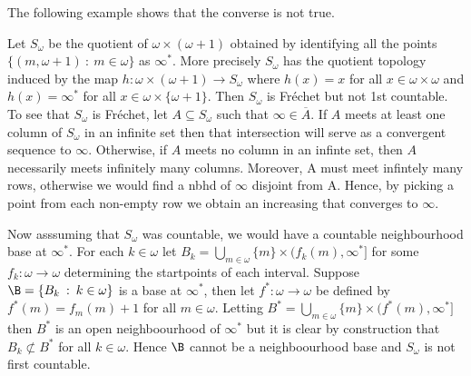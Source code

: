 \documentclass{article}
\begin{document}
The following example shows that the converse is not true. 
\begin{exam}
    Let \(S_{\omega}\) be the quotient of \(\omega \times (\omega + 1)\) obtained by identifying all the points \(\{(m, \omega + 1) \: : \: m \in \omega\}\) as \(\infty^{\ast}\). More precisely \(S_{\omega}\) has the quotient topology induced by the map \(h: \omega \times (\omega + 1) \to S_{\omega}\) where \(h(x) = x\) for all \(x \in \omega \times \omega\) and \(h(x) = \infty^{\ast}\) for all \(x \in \omega \times \{\omega + 1\}\). Then \(S_{\omega}\) is Fréchet but not 1st countable. To see that \(S_{\omega}\) is Fréchet, let \(A \subseteq S_{\omega}\) such that \(\infty \in \overline{A}\). If \(A\) meets at least one column of \(S_{\omega}\) in an infinite set then that intersection will serve as a convergent sequence to \(\infty\). Otherwise, if \(A\) meets no column in an infinte set, then \(A\) necessarily meets infinitely many columns. Moreover, A must meet infintely many rows, otherwise we would find a nbhd of \(\infty\) disjoint from A. Hence, by picking a point from each non-empty row we obtain an increasing that converges to \(\infty\).
    
    Now asssuming that \(S_{\omega}\) was countable, we would have a countable neighbourhood base at \(\infty^{\ast}\). For each \(k \in \omega\) let \(B_k = \bigcup_{m \in \omega}\{m\} \times (f_k(m), \infty^{\ast}]\) for some \(f_k: \omega \to \omega\) determining the startpoints of each interval. Suppose \(\B = \{B_k \: : \: k \in \omega\}\) is a base at \(\infty^{\ast}\), then let \(f^{\ast}: \omega \to \omega\) be defined by \(f^{\ast}(m) = f_m(m) + 1\) for all \(m \in \omega\). Letting \(B^{\ast} = \bigcup_{m \in \omega}\{m\} \times (f^{\ast}(m), \infty^{\ast}]\) then \(B^{\ast}\) is an open neighboourhood of \(\infty^{\ast}\) but it is clear by construction that \(B_k \not\subset B^{\ast}\) for all \(k \in \omega\). Hence \(\B\) cannot be a neighboourhood base and   \(S_{\omega}\) is not first countable.
\end{exam}
\end{document}
